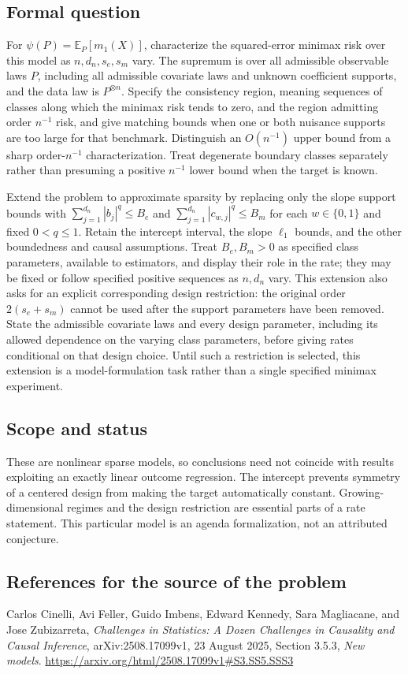 \documentclass[11pt,a4paper]{article}
\newcommand{\E}{\mathbb E}
\begin{document}
\subsection*{Formal question}
For $\psi(P)=\E_P[m_1(X)]$, characterize the squared-error minimax risk over this model as $n,d_n,s_e,s_m$ vary. The supremum is over all admissible observable laws $P$, including all admissible covariate laws and unknown coefficient supports, and the data law is $P^{\otimes n}$. Specify the consistency region, meaning sequences of classes along which the minimax risk tends to zero, and the region admitting order $n^{-1}$ risk, and give matching bounds when one or both nuisance supports are too large for that benchmark. Distinguish an $O(n^{-1})$ upper bound from a sharp order-$n^{-1}$ characterization. Treat degenerate boundary classes separately rather than presuming a positive $n^{-1}$ lower bound when the target is known.

Extend the problem to approximate sparsity by replacing only the slope support bounds with
$\sum_{j=1}^{d_n}|b_j|^q\leq B_e$ and $\sum_{j=1}^{d_n}|c_{w,j}|^q\leq B_m$ for each $w\in\{0,1\}$ and fixed $0<q\leq1$. Retain the intercept interval, the slope $\ell_1$ bounds, and the other boundedness and causal assumptions. Treat $B_e,B_m>0$ as specified class parameters, available to estimators, and display their role in the rate; they may be fixed or follow specified positive sequences as $n,d_n$ vary. This extension also asks for an explicit corresponding design restriction: the original order $2(s_e+s_m)$ cannot be used after the support parameters have been removed. State the admissible covariate laws and every design parameter, including its allowed dependence on the varying class parameters, before giving rates conditional on that design choice. Until such a restriction is selected, this extension is a model-formulation task rather than a single specified minimax experiment.
\subsection*{Scope and status}
These are nonlinear sparse models, so conclusions need not coincide with results exploiting an exactly linear outcome regression. The intercept prevents symmetry of a centered design from making the target automatically constant. Growing-dimensional regimes and the design restriction are essential parts of a rate statement. This particular model is an agenda formalization, not an attributed conjecture.
\subsection*{References for the source of the problem}
Carlos Cinelli, Avi Feller, Guido Imbens, Edward Kennedy, Sara Magliacane, and Jose Zubizarreta, \emph{Challenges in Statistics: A Dozen Challenges in Causality and Causal Inference}, arXiv:2508.17099v1, 23 August 2025, Section 3.5.3, \emph{New models}.
\url{https://arxiv.org/html/2508.17099v1#S3.SS5.SSS3}
\end{document}
